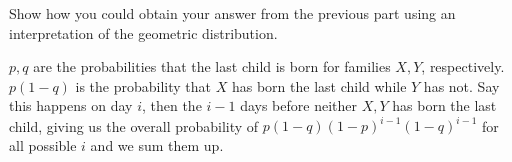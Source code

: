 \documentclass[11pt]{article}
\begin{document}
\begin{Parts}
    \Part Show how you could obtain your answer from the previous part using an interpretation of the geometric distribution.
    
    \begin{Answer}
        $p,q$ are the probabilities that the last child is born for families $X,Y$, respectively. $p(1-q)$ is the probability that $X$ has born the last child while $Y$ has not. 
        Say this happens on day $i$, then the $i-1$ days before neither $X,Y$ has born the last child, giving us the overall probability of 
        $p(1-q)(1-p)^{i-1}(1-q)^{i-1}$ for all possible $i$ and we sum them up. 
    \end{Answer}

\end{Parts}

\newpage
{}
\end{document}
